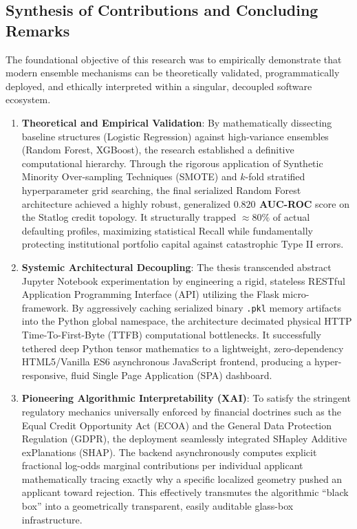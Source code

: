 \hypertarget{synthesis-of-contributions-and-concluding-remarks}{%
\subsection{Synthesis of Contributions and Concluding
Remarks}\label{synthesis-of-contributions-and-concluding-remarks}}

The foundational objective of this research was to empirically
demonstrate that modern ensemble mechanisms can be theoretically
validated, programmatically deployed, and ethically interpreted within a
singular, decoupled software ecosystem.

\begin{enumerate}
\def\labelenumi{\arabic{enumi}.}
\tightlist
\item
  \textbf{Theoretical and Empirical Validation}: By mathematically
  dissecting baseline structures (Logistic Regression) against
  high-variance ensembles (Random Forest, XGBoost), the research
  established a definitive computational hierarchy. Through the rigorous
  application of Synthetic Minority Over-sampling Techniques (SMOTE) and
  \(k\)-fold stratified hyperparameter grid searching, the final
  serialized Random Forest architecture achieved a highly robust,
  generalized \textbf{\(0.820\) AUC-ROC} score on the Statlog credit
  topology. It structurally trapped \(\approx 80\%\) of actual
  defaulting profiles, maximizing statistical Recall while fundamentally
  protecting institutional portfolio capital against catastrophic Type
  II errors.
\item
  \textbf{Systemic Architectural Decoupling}: The thesis transcended
  abstract Jupyter Notebook experimentation by engineering a rigid,
  stateless RESTful Application Programming Interface (API) utilizing
  the Flask micro-framework. By aggressively caching serialized binary
  \texttt{.pkl} memory artifacts into the Python global namespace, the
  architecture decimated physical HTTP Time-To-First-Byte (TTFB)
  computational bottlenecks. It successfully tethered deep Python tensor
  mathematics to a lightweight, zero-dependency HTML5/Vanilla ES6
  asynchronous JavaScript frontend, producing a hyper-responsive, fluid
  Single Page Application (SPA) dashboard.
\item
  \textbf{Pioneering Algorithmic Interpretability (XAI)}: To satisfy the
  stringent regulatory mechanics universally enforced by financial
  doctrines such as the Equal Credit Opportunity Act (ECOA) and the
  General Data Protection Regulation (GDPR), the deployment seamlessly
  integrated SHapley Additive exPlanations (SHAP). The backend
  asynchronously computes explicit fractional log-odds marginal
  contributions per individual applicant mathematically tracing exactly
  why a specific localized geometry pushed an applicant toward
  rejection. This effectively transmutes the algorithmic ``black box''
  into a geometrically transparent, easily auditable glass-box
  infrastructure.
\end{enumerate}

